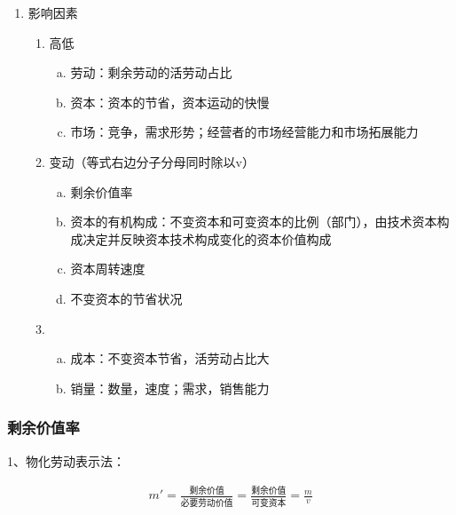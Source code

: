 \documentclass[12pt]{book}
\begin{document}
\begin{enumerate}[1.]
    \item 影响因素
          \begin{enumerate}[(1)]
              \item 高低
                    \begin{enumerate}[a.]
                        \item 劳动：剩余劳动的活劳动占比
                        \item 资本：资本的节省，资本运动的快慢
                        \item 市场：竞争，需求形势；经营者的市场经营能力和市场拓展能力
                    \end{enumerate}
              \item 变动（等式右边分子分母同时除以v）
                    \begin{enumerate}[a.]
                        \item 剩余价值率
                        \item 资本的有机构成：不变资本和可变资本的比例（部门），由技术资本构成决定并反映资本技术构成变化的资本价值构成
                        \item 资本周转速度
                        \item 不变资本的节省状况
                    \end{enumerate}
              \item
                    \begin{enumerate}[a.]
                        \item 成本：不变资本节省，活劳动占比大
                        \item 销量：数量，速度；需求，销售能力
                    \end{enumerate}
          \end{enumerate}
\end{enumerate}




\subsubsection{剩余价值率}



1、物化劳动表示法：

\begin{gather*}
m'=\frac{\text{剩余价值}}{\text{必要劳动价值}}
=\frac{\text{剩余价值}}{\text{可变资本}}
= \frac{m}{v}
\end{gather*}
\end{document}
